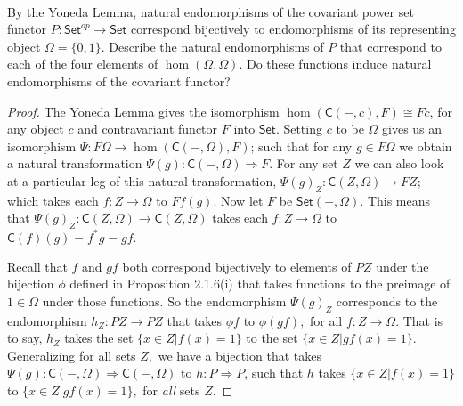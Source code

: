 \documentclass[main.tex]{subfiles}
\begin{document}
\paragraph{}
\begin{exercise}
	By the Yoneda Lemma, natural endomorphisms of the covariant power set
	functor \(P\colon\textsf{Set}^{op} \to \textsf{Set}\) correspond
	bijectively to endomorphisms of its representing object \(\Omega = \{0,
	1\}\). Describe the natural endomorphisms of \(P\) that correspond to
	each of the four elements of \(\hom(\Omega, \Omega)\). Do these
	functions induce natural endomorphisms of the covariant functor?	
\end{exercise}

\begin{proof}
	The Yoneda Lemma gives the isomorphism $
	\hom(\mathsf{C}(-,c), F) \cong Fc $, for any object $ c $ and
	contravariant functor $ F $ into $ \mathsf{Set} $. Setting $ c $ to be
	$ \Omega $ gives us an isomorphism $ \Psi\colon F\Omega \to
	\hom(\mathsf{C}(-,\Omega), F) $; such that for any $ g \in F\Omega $ we
	obtain a natural transformation $ \Psi(g)\colon\mathsf{C}(-,\Omega)
	\Rightarrow F. $ For any set $ Z $ we can also look at a particular leg
	of this natural transformation, $ \Psi(g)_Z\colon\mathsf{C}(Z,\Omega) \to
	FZ; $ which takes each $ f\colon Z \to \Omega $ to $ Ff(g). $ Now let $ F $
	be $ \mathsf{Set}(-, \Omega). $ This means that $ \Psi(g)_Z:
	\mathsf{C}(Z,\Omega) \to  \mathsf{C}(Z,\Omega) $ takes each $ f\colon Z \to
	\Omega $ to $ \mathsf{C}(f)(g) = f^*g = gf. $

	Recall that $ f $ and $ gf $ both correspond bijectively to elements of
	$ PZ $ under the bijection $ \phi $ defined in Proposition 2.1.6(i)
	that takes functions to the preimage of $ 1 \in \Omega $ under those
	functions. So the endomorphism $ \Psi(g)_Z $ corresponds to the
	endomorphism $ h_Z\colon PZ \to PZ $ that takes $ \phi f $ to $ \phi (gf), $
	for all $ f\colon Z \to \Omega. $ That is to say, $ h_Z $ takes the set $
	\{x \in Z | f(x) = 1\} $ to the set $ \{x \in Z | gf(x) = 1\}. $
	Generalizing for all sets $ Z, $ we have a bijection that takes $
	\Psi(g)\colon\mathsf{C}(-,\Omega) \Rightarrow \mathsf{C}(-,\Omega) $ to $
	h\colon P \Rightarrow P $, such that $ h $ takes $ \{x \in Z | f(x) = 1\} $
	to $ \{x \in Z | gf(x) = 1\}, $ for \textit{all} sets $ Z. $ 


\end{proof}
\end{document}
